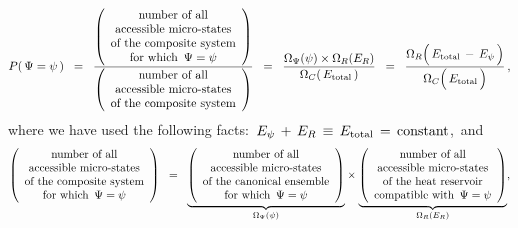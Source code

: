 \begin{equation*}
P(\,\Psi = \psi\,)
\;\; = \;\;
    \dfrac{
        \left(\begin{array}{c}
            \textnormal{number of all}
            \\
            \textnormal{accessible micro-states}
            \\
            \textnormal{of the composite system}
            \\
            \textnormal{for which \,$\Psi = \psi$}
            \end{array}\right)
        }{
        \left(\begin{array}{c}
            \textnormal{number of all}
            \\
            \textnormal{accessible micro-states}
            \\
            \textnormal{of the composite system}
            \end{array}\right)
        }
\;\; = \;\;
    \dfrac{
        \Omega_{\Psi}(\psi)
        \times
        \Omega_{R}(E_{R})
        }{
        \Omega_{C}(\,E_{\textnormal{total}}\,)
        }
\;\; = \;\;
    \dfrac{
        \Omega_{R}\!\left(\,E_{\textnormal{total}} \,\overset{{\color{white}.}}{-}\, E_{\psi}\,\right)
        }{
        \Omega_{C}\!\left(\,\overset{{\color{white}.}}{E_{\textnormal{total}}}\,\right)
        }\,,
\end{equation*}
where we have used the following facts:
\,$
E_{\psi} \,+\, E_{R}
\, \equiv \,
    E_{\textnormal{total}}
\, = \,
    \textnormal{constant}
$,\,
and
\begin{equation*}
\left(\begin{array}{c}
    \textnormal{number of all}
    \\
    \textnormal{accessible micro-states}
    \\
    \textnormal{of the composite system}
    \\
    \textnormal{for which \,$\Psi = \psi$}
    \end{array}\right)
\;\; = \;\;
    \underset{\Omega_{\Psi}(\psi)}{\underbrace{\left(\begin{array}{c}
        \textnormal{number of all}
        \\
        \textnormal{accessible micro-states}
        \\
        \textnormal{of the canonical ensemble}
        \\
        \textnormal{for which \,$\Psi = \psi$}
        \end{array}\right)}}
    \times
    \underset{\Omega_{R}(E_{R})}{\underbrace{\left(\begin{array}{c}
        \textnormal{number of all}
        \\
        \textnormal{accessible micro-states}
        \\
        \textnormal{of the heat reservoir}
        \\
        \textnormal{compatible with \,$\Psi = \psi$}
        \end{array}\right)}},
\end{equation*}
